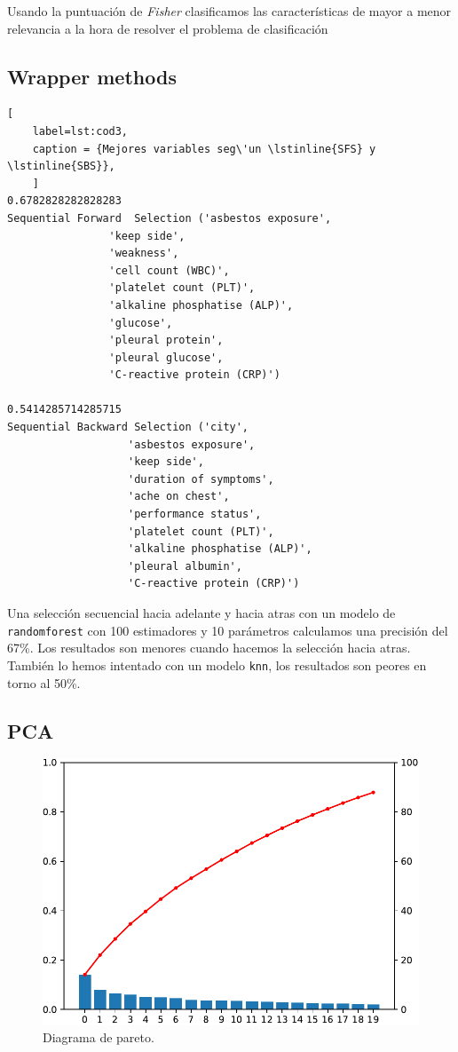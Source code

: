 \documentclass{article}
\begin{document}
Usando la puntuación de \textit{Fisher} clasificamos las
características de mayor a menor relevancia a la hora de resolver el
problema de clasificación

\newpage
\subsection{Wrapper methods}
\begin{lstlisting}[
	label=lst:cod3,
	caption = {Mejores variables seg\'un \lstinline{SFS} y \lstinline{SBS}},
	]
0.6782828282828283
Sequential Forward  Selection ('asbestos exposure',
				'keep side',
				'weakness',
				'cell count (WBC)',
				'platelet count (PLT)',
				'alkaline phosphatise (ALP)',
				'glucose',
				'pleural protein',
				'pleural glucose',
				'C-reactive protein (CRP)')

0.5414285714285715
Sequential Backward Selection ('city',
			       'asbestos exposure',
			       'keep side',
			       'duration of symptoms',
			       'ache on chest',
			       'performance status',
			       'platelet count (PLT)',
			       'alkaline phosphatise (ALP)',
			       'pleural albumin',
			       'C-reactive protein (CRP)')
\end{lstlisting}

Una selección secuencial hacia adelante y hacia atras con un modelo de
\lstinline{randomforest} con 100 estimadores y 10 parámetros
calculamos una precisión del 67\%. Los resultados son menores cuando
hacemos la selección hacia atras. También lo hemos intentado con un
modelo \lstinline{knn}, los resultados son peores en torno al 50\%.

\newpage
\subsection{PCA}

\begin{figure}[h]
\centering
\includegraphics[width = 0.9\linewidth]{../images/pareto.pdf}
\caption{Diagrama de pareto.}
\end{figure}
\end{document}
